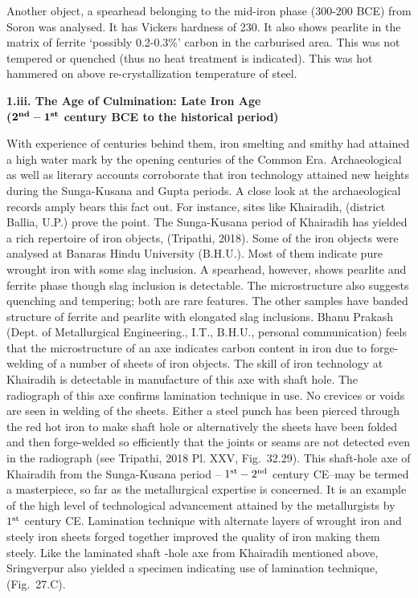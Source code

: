 Another object, a spearhead belonging to the mid-iron phase (300-200 BCE) from Soron was analysed. It has Vickers hardness of 230. It also shows pearlite in the matrix of ferrite ‘possibly 0.2-0.3\%’ carbon in the carburised area. This was not tempered or quenched (thus no heat treatment is indicated). This was hot hammered on above re-crystallization temperature of steel. 

\vspace{.3cm}

\textbf{\large 1.iii. The Age of Culmination: Late Iron Age\\ ($\mathbf{2^{\rm \bf nd} -1^{\rm \bf st}}$ century BCE to the historical period)}

With experience of centuries behind them, iron smelting and smithy had attained a high water mark by the opening centuries of the Common Era. Archaeological as well as literary accounts corroborate that iron technology attained new heights during the Sunga-Kusana and Gupta periods. A close look at the archaeological records amply bears this fact out. For instance, sites like Khairadih, (district Ballia, U.P.) prove the point. The Sunga-Kusana period of Khairadih has yielded a rich repertoire of iron objects, (Tripathi, 2018). Some of the iron objects were analysed at Banaras Hindu University (B.H.U.). Most of them indicate pure wrought iron with some slag inclusion. A spearhead, however, shows pearlite and ferrite phase though slag inclusion is detectable. The microstructure also suggests quenching and tempering; both are rare features. The other samples have banded structure of ferrite and pearlite with elongated slag inclusions. Bhanu Prakash (Dept. of Metallurgical Engineering., I.T., B.H.U., personal communication) feels that the microstructure of an axe indicates carbon content in iron due to forge-welding of a number of sheets of iron objects. The skill of iron technology at Khairadih is detectable in manufacture of this axe with shaft hole. The radiograph of this axe confirms lamination technique in use. No crevices or voids are seen in welding of the sheets. Either a steel punch has been pierced through the red hot iron to make shaft hole or alternatively the sheets have been folded and then forge-welded so efficiently that the joints or seams are not detected even in the radiograph (see Tripathi, 2018 Pl. XXV, Fig.~32.29). This shaft-hole axe of Khairadih from the Sunga-Kusana period – $1^{\rm st}  -2^{\rm nd}$ century CE–may be termed a masterpiece, so far as the metallurgical expertise is concerned. It is an example of the high level of technological advancement attained by the metallurgists by $1^{\rm st}$ century CE. Lamination technique with alternate layers of wrought iron and steely iron sheets forged together improved the quality of iron making them steely. Like the laminated shaft -hole axe from Khairadih mentioned above, Sringverpur also yielded a specimen indicating use of lamination technique, (Fig.~27.C).


